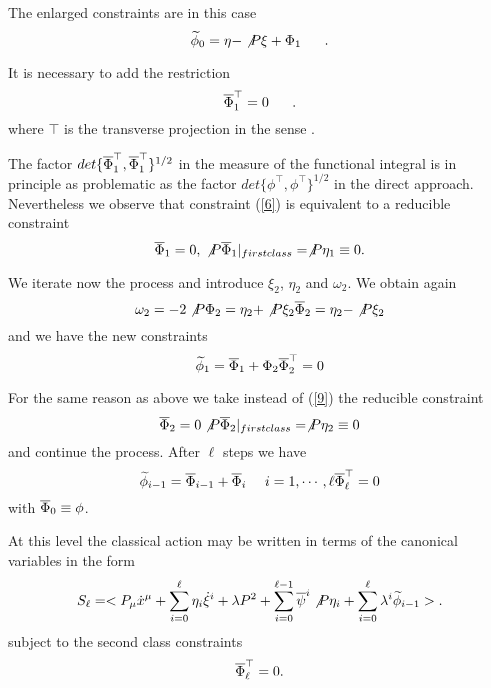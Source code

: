 \documentclass[a4paper,10pt]{article}
\begin{document}
The enlarged constraints are in this case
\begin{equation}
\label{5}
\widetilde{\phi}_0=\eta -\not{P} \xi +\Phi_1\ \ \ \ \ .
\end{equation}

It is necessary to add the restriction
\begin{equation}
\label{6}
\overline{\Phi}_1^\top =0\ \ \ \ \ .
\end{equation}
where $\top$ is the transverse projection in the sense \cite{[11]}.

The factor $det\{\overline{\Phi}^\top_1,\overline{\Phi}^\top_1\}^{1/2}$ in the
measure of the functional integral is in principle as problematic
as the factor $det\{\phi^\top ,\phi^\top \}^{1/2}$ in the  direct
approach. Nevertheless we observe that constraint (\ref{6}) is
equivalent to a reducible constraint
\begin{equation}
\label{7}
\overline{\Phi}_1 = 0,\\
\not{P} \overline{\Phi}_1|_{{first class}} =\not{P} \eta_1 \equiv 0 .
\end{equation}

We iterate now the process and introduce $\xi_2$, $\eta_2$ and $\omega_2$.
We obtain again
\begin{equation}
\label{8}
\omega_2 =-2\not{P} \\
\Phi_2 =\eta_2+\not{P} \xi_2 \\
\overline{\Phi}_2 =\eta_2-\not{P} \xi_2
\end{equation}
and we have the new constraints
\begin{equation}
\label{9}
\widetilde{\phi}_1 =\overline{\Phi}_1+ \Phi_2 \\
\overline{\Phi}^\top_2 =0
\end{equation}

For the same reason as above we take instead of (\ref{9}) the reducible constraint
\begin{equation}
\label{11}
\overline{\Phi}_2 =0\\
\not{P} \overline{\Phi}_2|_{{first class}} =\not{P} \eta_2 \equiv 0
\end{equation}
and continue the process. After $\ell$ steps we have
\begin{equation}
\label{12}
\widetilde{\phi}_{i-1} =\overline{\Phi}_{i-1}+\overline{\Phi}_i\ \ \ \ i=1,\cdots ,\ell\\
\overline{\Phi}^\top_{\ell} =0
\end{equation}
with $\overline{\Phi}_0 \equiv \phi$.

At this level the classical action may be written in terms of the canonical
variables in the form
\begin{equation}
\label{13}
S_\ell =<P_\mu \dot{x}^\mu +\sum_{i=0}^\ell \eta_i \dot{\xi}^i+
\lambda P^2+\sum_{i=0}^{\ell -1}\overline{\psi}^i\not{P} \eta_i +
\sum^{\ell}_{i=0}\lambda^i\widetilde{\phi}_{i-1}>.
\end{equation}
subject to the second class constraints
\begin{displaymath}
\overline{\Phi}^\top_\ell =0.
\end{displaymath}
\end{document}
